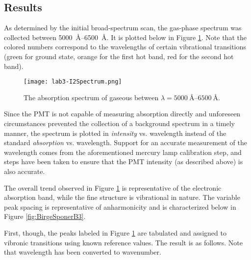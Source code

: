 \documentclass[../labs.tex]{subfiles}
\begin{document}
\subsection*{Results}

As determined by the initial broad-spectrum scan, the gas-phase spectrum was collected between \SIrange{5000}{6500}{\angstrom}. It is plotted below in Figure \ref{fig:I2Spectrum3}. Note that the colored numbers correspond to the wavelengths of certain vibrational transitions (green for ground state, orange for the first hot band, red for the second hot band).
\begin{figure}[H]
    \centering
    \texttt{[image: lab3-I2Spectrum.png]}
    \caption{The absorption spectrum of gaseous  between $\lambda=\SIrange{5000}{6500}{\angstrom}$.}
    \label{fig:I2Spectrum3}
\end{figure}
Since the PMT is not capable of measuring absorption directly and unforeseen circumstances prevented the collection of a background spectrum in a timely manner, the spectrum is plotted in \emph{intensity} vs. wavelength instead of the standard \emph{absorption} vs. wavelength. Support for an accurate measurement of the wavelength comes from the aforementioned mercury lamp calibration step, and steps have been taken to ensure that the PMT intensity (as described above) is also accurate.\par
The overall trend observed in Figure \ref{fig:I2Spectrum3} is representative of the electronic absorption band, while the fine structure is vibrational in nature. The variable peak spacing is representative of anharmonicity and is characterized below in Figure \ref{fig:BirgeSponerB3}.\par
First, though, the peaks labeled in Figure \ref{fig:I2Spectrum3} are tabulated and assigned to vibronic transitions using known reference values. The result is as follows. Note that wavelength has been converted to wavenumber.
\end{document}
